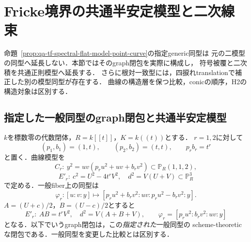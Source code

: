 \section{Fricke境界の共通半安定模型と二次線束}
\label{sec:qa-spectral-boundary-models}

命題~\ref{prop:qa-tf-spectral-flat-model-point-curve}の指定generic同型は
元の二模型の同型へ延長しない．本節ではそのgraph閉包を実際に構成し，
符号被覆と二次積を共通正則模型へ延長する．
さらに根対一致型には，四捩れtranslationで補正した別の模型同型が存在する．
曲線の構造層を保つ比較，conicの順序，H2の構造対象は区別する．

\subsection{指定した一般同型のgraph閉包と共通半安定模型}
\label{subsec:qa-boundary-graph-semistable}

$k$を標数零の代数閉体，$R=k[[t]]$，$K=k((t))$とする．
$r=1,2$に対して
\[
 (p_1,b_1)=(1,t),\qquad(p_2,b_2)=(t,t),\qquad p_rb_r=t^r
\]
と置く．曲線模型を
\[
 C_r:\ y^2=uv(p_ru^2+uv+b_rv^2)
       \subset\mathbb P_R(1,1,2),
\]
\[
 E'_r:\ c^2=U^2-4t^rV^2,\quad d^2=V(U+V)
       \subset\mathbb P_R^3
\]
で定める．一般fiber上の同型は
\[
 \varphi_r:[u:v:y]\longmapsto
 [p_ru^2+b_rv^2:uv:p_ru^2-b_rv^2:y].
 \tag{G-phi}\label{eq:qa-boundary-graph-phi}
\]
$A=(U+c)/2$，$B=(U-c)/2$とすると
\[
 E'_r:\ AB=t^rV^2,\quad d^2=V(A+B+V),\qquad
 \varphi_r=[p_ru^2:b_rv^2:uv:y]
 \tag{G-AB}\label{eq:qa-boundary-graph-ab}
\]
となる．以下でいうgraph閉包は，この\emph{指定された}一般同型の
scheme-theoreticな閉包である．一般同型を変更した比較とは区別する．

